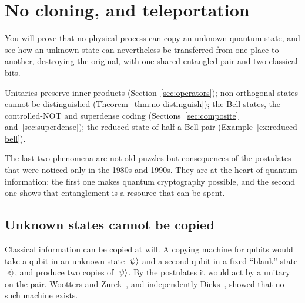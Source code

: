 \section{No cloning, and teleportation}\label{sec:teleportation}

\begin{objectives}
  You will prove that no physical process can copy an unknown quantum state, and see how an unknown state can nevertheless be transferred from one place to another, destroying the original, with one shared entangled pair and two classical bits.
\end{objectives}

\begin{recall}
  Unitaries preserve inner products (Section~\ref{sec:operators}); non-orthogonal states cannot be distinguished (Theorem~\ref{thm:no-distinguish}); the Bell states, the controlled-NOT and superdense coding (Sections~\ref{sec:composite} and~\ref{sec:superdense}); the reduced state of half a Bell pair (Example~\ref{ex:reduced-bell}).
\end{recall}

The last two phenomena are not old puzzles but consequences of the postulates that were noticed only in the 1980s and 1990s. They are at the heart of quantum information: the first one makes quantum cryptography possible, and the second one shows that entanglement is a resource that can be spent.

\subsection{Unknown states cannot be copied}

Classical information can be copied at will. A copying machine for qubits would take a qubit in an unknown state $\left|\psi\right\rangle$ and a second qubit in a fixed ``blank'' state $\left|e\right\rangle$, and produce two copies of $\left|\psi\right\rangle$. By the postulates it would act by a unitary on the pair. Wootters and Zurek~\cite{wootters1982}, and independently Dieks~\cite{dieks1982}, showed that no such machine exists.

